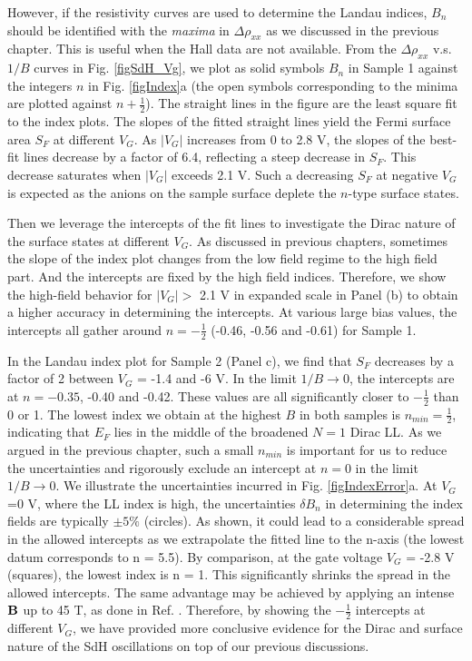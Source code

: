 However, if the resistivity curves are used to determine the Landau indices, $B_n$ should be identified with the \emph{maxima} in $\Delta\rho_{xx}$ as we discussed in the previous chapter. This is useful when the Hall data are not available. From the $\Delta\rho_{xx}$ v.s. $1/B$ curves in Fig. \ref{figSdH_Vg}, we plot as solid symbols $B_n$ in Sample 1 against the integers $n$ in Fig. \ref{figIndex}a
(the open symbols corresponding to the minima are plotted against $n+\frac12$). The straight lines in the figure are the least square fit to the index plots. The slopes of the fitted straight lines yield the Fermi surface area $S_F$ at different $V_G$. 
As $|V_G|$ increases from 0 to 2.8 V, the slopes of the best-fit lines 
decrease by a factor of 6.4, reflecting a steep decrease in $S_F$. 
This decrease saturates when $|V_G|$ exceeds 2.1 V. Such a decreasing $S_F$ at negative $V_G$ is expected as the anions on the sample surface deplete the $n$-type surface states.  

Then we leverage the intercepts of the fit lines to investigate the Dirac nature of the surface states at different $V_G$. As discussed in previous chapters, sometimes the slope of the index plot changes from the low field regime to the high field part. And the intercepts are fixed by the high field indices. Therefore, we show the high-field behavior for $|V_G|>$ 2.1 V in expanded scale in Panel (b) to obtain a higher accuracy in determining the intercepts. At various large bias values, the intercepts all gather around $n = -\frac12$ 
(-0.46, -0.56 and -0.61) for Sample 1. 

In the Landau index plot for Sample 2 (Panel c), we find that $S_F$ decreases by a factor
of 2 between $V_G$ = -1.4 and -6 V. In the limit $1/B\to 0$, the intercepts are at
$n= -0.35$, -0.40 and -0.42.  These values are all significantly closer to $-\frac12$ than 0 or 1.
The lowest index we obtain at the highest $B$ in both samples is $n_{min}=\frac12$, indicating that $E_F$ lies in the middle of the broadened $N=1$ Dirac LL. As we argued in the previous chapter, such a small $n_{min}$ is important for us to reduce the uncertainties and rigorously exclude an intercept at $n=0$ in the limit $1/B\to 0$. We illustrate the uncertainties incurred in Fig. \ref{figIndexError}a. At $V_G$=0 V, where the LL index is high, the uncertainties $\delta B_n$ in determining the index fields are typically $\pm5\%$ (circles). As shown, it could lead to a considerable spread in the allowed intercepts as we extrapolate the fitted line to the n-axis (the lowest datum corresponds to n = 5.5). By comparison, at the gate voltage $V_G$ = -2.8 V 
(squares), the lowest index is n = 1. This significantly shrinks the spread in the allowed intercepts. The same advantage may be achieved by applying an intense $\bf B$ up to 45 T, as done in Ref. \cite{Xiong2012b}.
Therefore, by showing the $-\frac12$ intercepts at different $V_G$, we have provided more conclusive evidence for the Dirac and surface nature of the SdH oscillations on top of our previous discussions.

